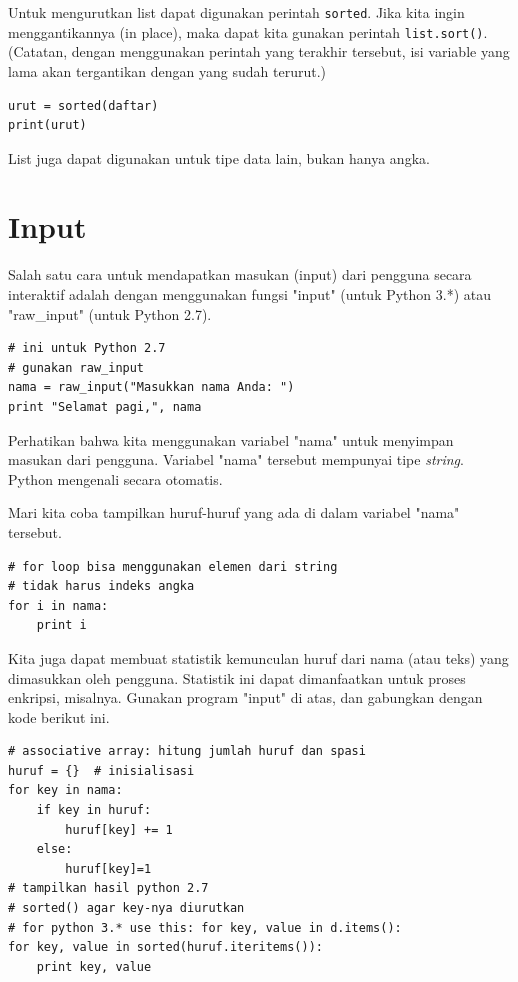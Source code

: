 Untuk mengurutkan list dapat digunakan perintah {\tt sorted}.
Jika kita ingin menggantikannya (in place), maka dapat kita gunakan
perintah {\tt list.sort()}. (Catatan, dengan menggunakan perintah yang
terakhir tersebut, isi variable yang lama akan tergantikan dengan
yang sudah terurut.)
\begin{verbatim}
urut = sorted(daftar)
print(urut)
\end{verbatim}

List juga dapat digunakan untuk tipe data lain, bukan hanya angka.

\section{Input}
Salah satu cara untuk mendapatkan masukan (input) dari pengguna secara
interaktif adalah dengan menggunakan fungsi "input" (untuk Python 3.*)
atau "raw\_input" (untuk Python 2.7).

\begin{verbatim}
# ini untuk Python 2.7
# gunakan raw_input
nama = raw_input("Masukkan nama Anda: ")
print "Selamat pagi,", nama
\end{verbatim}

Perhatikan bahwa kita menggunakan variabel "nama" untuk menyimpan masukan
dari pengguna. Variabel "nama" tersebut mempunyai tipe {\em string}.
Python mengenali secara otomatis.

Mari kita coba tampilkan huruf-huruf yang ada di dalam variabel "nama"
tersebut.

\begin{verbatim}
# for loop bisa menggunakan elemen dari string
# tidak harus indeks angka
for i in nama:
    print i
\end{verbatim}

Kita juga dapat membuat statistik kemunculan huruf dari nama (atau teks)
yang dimasukkan oleh pengguna. Statistik ini dapat dimanfaatkan untuk
proses enkripsi, misalnya. Gunakan program "input" di atas, dan gabungkan
dengan kode berikut ini.

\begin{verbatim}
# associative array: hitung jumlah huruf dan spasi
huruf = {}  # inisialisasi
for key in nama:
    if key in huruf:
        huruf[key] += 1
    else:
        huruf[key]=1
# tampilkan hasil python 2.7
# sorted() agar key-nya diurutkan
# for python 3.* use this: for key, value in d.items():
for key, value in sorted(huruf.iteritems()):
    print key, value
\end{verbatim}

